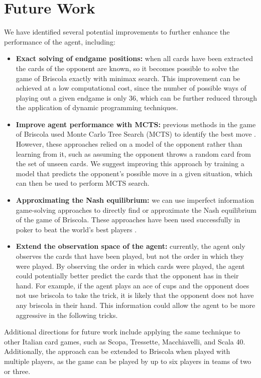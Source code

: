 \section{Future Work}
We have identified several potential improvements to further enhance the performance of the agent, including:
\begin{itemize}
    \item \textbf{Exact solving of endgame positions:} when all cards have been extracted the cards of the opponent are known, so it becomes possible to solve the game of Briscola exactly with minimax search. This improvement can be achieved at a low computational cost, since the number of possible ways of playing out a given endgame is only 36, which can be further reduced through the application of dynamic programming techniques.
    \item \textbf{Improve agent performance with MCTS:} previous methods in the game of Briscola used Monte Carlo Tree Search (MCTS) to identify the best move \cite{Briscola-mcts-Playing-Algorithm, villa2013-briscola-mcts}. However, these approaches relied on a model of the opponent rather than learning from it, such as assuming the opponent throws a random card from the set of unseen cards. We suggest improving this approach by training a model that predicts the opponent's possible move in a given situation, which can then be used to perform MCTS search.
    \item \textbf{Approximating the Nash equilibrium:} we can use imperfect information game-solving approaches to directly find or approximate the Nash equilibrium of the game of Briscola. These approaches have been used successfully in poker to beat the world's best players \cite{libratus}.
    \item \textbf{Extend the observation space of the agent:} currently, the agent only observes the cards that have been played, but not the order in which they were played. By observing the order in which cards were played, the agent could potentially better predict the cards that the opponent has in their hand. For example, if the agent plays an ace of cups and the opponent does not use briscola to take the trick, it is likely that the opponent does not have any briscola in their hand. This information could allow the agent to be more aggressive in the following tricks.
\end{itemize}
Additional directions for future work include applying the same technique to other Italian card games, such as Scopa, Tressette, Macchiavelli, and Scala 40. Additionally, the approach can be extended to Briscola when played with multiple players, as the game can be played by up to six players in teams of two or three.
